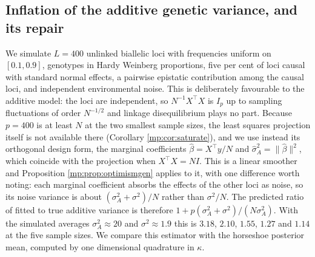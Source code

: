 \subsection{Inflation of the additive genetic variance, and its repair}
\label{mp:sec:numB}

We simulate $L=400$ unlinked biallelic loci with frequencies uniform on $[0.1,0.9]$,
genotypes in Hardy Weinberg proportions, five per cent of loci causal with standard normal
effects, a pairwise epistatic contribution among the causal loci, and independent
environmental noise. This is deliberately favourable to the additive model: the loci are
independent, so $N^{-1}X^\top X$ is $I_p$ up to sampling fluctuations of order $N^{-1/2}$ and
linkage disequilibrium plays no part. Because $p=400$ is at least $N$ at the two smallest sample
sizes, the least squares projection itself is not available there (Corollary
\ref{mp:cor:saturate}), and we use instead its orthogonal design form, the marginal
coefficients $\hat\beta=X^\top y/N$ and $\hat\sigma_A^2=\|\hat\beta\|^2$, which coincide with
the projection when $X^\top X=NI$. This is a linear smoother and Proposition
\ref{mp:prop:optimismgen} applies to it, with one difference worth noting: each marginal
coefficient absorbs the effects of the other loci as noise, so its noise variance is about
$(\sigma_A^2+\sigma^2)/N$ rather than $\sigma^2/N$. The predicted ratio of fitted to true
additive variance is therefore $1+p(\sigma_A^2+\sigma^2)/(N\sigma_A^2)$. With the simulated
averages $\sigma_A^2\approx20$ and $\sigma^2\approx1.9$ this is $3.18$, $2.10$, $1.55$,
$1.27$ and $1.14$ at the five sample sizes. We compare this estimator with the horseshoe
posterior mean, computed by one dimensional quadrature in $\kappa$.

